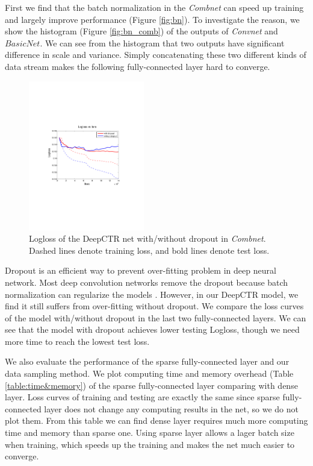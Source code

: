 \documentclass{sig-alternate}
\begin{document}
First we find that the batch normalization in the \emph{Combnet} can speed up training and largely improve performance (Figure \ref{fig:bn}). To investigate the reason, we show the histogram (Figure \ref{fig:bn_comb}) of the outputs of \emph{Convnet} and $BasicNet$. We can see from the histogram  that two outputs have significant difference in scale and variance. Simply concatenating  these two different kinds of data stream  makes the following fully-connected layer hard to converge. 
\begin{figure}
	\centering
	\includegraphics[width=0.45\textwidth]{dropout_test_train}
	\caption{Logloss of the DeepCTR net with/without dropout in \emph{Combnet}. Dashed lines denote training loss, and bold lines denote test loss.}
	\label{fig:dropout}
\end{figure}

Dropout \cite{srivastava2014dropout} is an efficient way to prevent over-fitting problem in deep neural network. Most deep convolution networks remove the dropout because batch normalization can regularize the models \cite{he2015deep, ioffe2015batch}. However, in our DeepCTR model, we find it still suffers from over-fitting without dropout. We compare the loss curves of the model with/without dropout in the last two fully-connected layers. We can see that the model with dropout achieves lower testing Logloss, though we need more time to reach the lowest test loss.


We also evaluate the performance of the sparse fully-connected layer and our data sampling method. We plot computing time and memory overhead (Table \ref{table:time&memory}) of the sparse fully-connected layer comparing with dense layer. Loss curves of training and testing are exactly the same since sparse fully-connected layer does not change any computing results in the net, so we do not plot them. From this table we can find dense layer  requires much more computing time and memory than sparse one. Using sparse layer allows a lager batch size when training, which speeds up the training and makes the net much easier to converge. 
\end{document}

